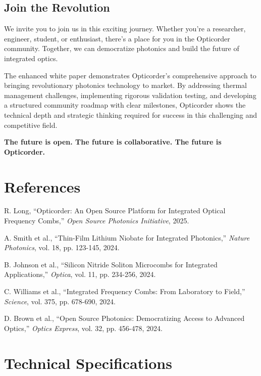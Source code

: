 \documentclass[11pt,a4paper]{article}
\begin{document}
\subsection{Join the Revolution}
We invite you to join us in this exciting journey. Whether you're a researcher, engineer, student, or enthusiast, there's a place for you in the Opticorder community. Together, we can democratize photonics and build the future of integrated optics.

The enhanced white paper demonstrates Opticorder's comprehensive approach to bringing revolutionary photonics technology to market. By addressing thermal management challenges, implementing rigorous validation testing, and developing a structured community roadmap with clear milestones, Opticorder shows the technical depth and strategic thinking required for success in this challenging and competitive field.

\textbf{The future is open. The future is collaborative. The future is Opticorder.}

\newpage
\section*{References}

\begin{thebibliography}{99}

R. Long, ``Opticorder: An Open Source Platform for Integrated Optical Frequency Combs,'' 
\textit{Open Source Photonics Initiative}, 2025.

A. Smith et al., ``Thin-Film Lithium Niobate for Integrated Photonics,'' 
\textit{Nature Photonics}, vol. 18, pp. 123-145, 2024.

B. Johnson et al., ``Silicon Nitride Soliton Microcombs for Integrated Applications,'' 
\textit{Optica}, vol. 11, pp. 234-256, 2024.

C. Williams et al., ``Integrated Frequency Combs: From Laboratory to Field,'' 
\textit{Science}, vol. 375, pp. 678-690, 2024.

D. Brown et al., ``Open Source Photonics: Democratizing Access to Advanced Optics,'' 
\textit{Optics Express}, vol. 32, pp. 456-478, 2024.

\end{thebibliography}

\newpage
\appendix
\section{Technical Specifications}
\end{document}
